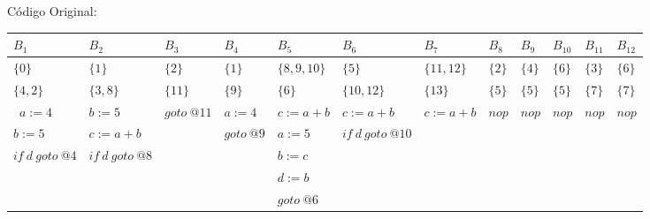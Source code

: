 C\'odigo Original:

\begin{table}[ht]
\begin{scriptsize}
\begin{tabular}{l|l|l|l|l|l|l|l|l|l|l|l}
$B_{1}$ & $B_{2}$ & $B_{3}$ & $B_{4}$ & $B_{5}$ & $B_{6}$ & $B_{7}$ & $B_{8}$ & $B_{9}$ & $B_{10}$ & $B_{11}$ & $B_{12}$ \\
\hline
$\{0\}$ & $\{1\}$ & $\{2\}$ & $\{1\}$ & $\{8, 9, 10\}$ & $\{5\}$ & $\{11, 12\}$ & $\{2\}$ & $\{4\}$ & $\{6\}$ & $\{3\}$ & $\{6\}$ \\
$\{4, 2\}$ & $\{3, 8\}$ & $\{11\}$ & $\{9\}$ & $\{6\}$ & $\{10, 12\}$ & $\{13\}$ & $\{5\}$ & $\{5\}$ & $\{5\}$ & $\{7\}$ & $\{7\}$ \\
\hline\
$a:=4$ & $b:=5$ & $goto\:@11$ & $a:=4$ & $c:=a+b$ & $c:=a+b$ & $c:=a+b$ & $nop$ & $nop$ & $nop$ & $nop$ & $nop$ \\
$b:=5$ & $c:=a+b$ &  & $goto\:@9$ & $a:=5$ & $if\:d\:goto\:@10$ &  &  &  &  &  &  \\
$if\:d\:goto\:@4$ & $if\:d\:goto\:@8$ &  &  & $b:=c$ &  &  &  &  &  &  &  \\
 &  &  &  & $d:=b$ &  &  &  &  &  &  &  \\
 &  &  &  & $goto\:@6$ &  &  &  &  &  &  &  \\
\end{tabular}
\end{scriptsize}
\end{table}

